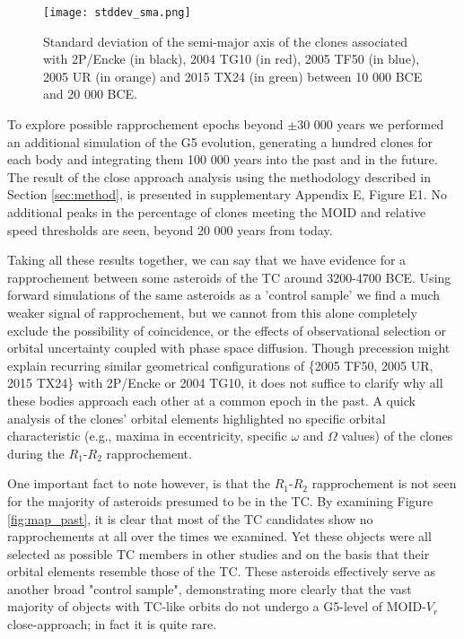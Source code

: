 \documentclass[letters,a4paper,fleqn,usenatbib]{mnras}
\begin{document}
 \begin{figure}
     \centering
     \texttt{[image: stddev\_sma.png]} 
     \caption{Standard deviation of the semi-major axis of the clones associated with 2P/Encke (in black), 2004 TG10 (in red), 2005 TF50 (in blue), 2005 UR (in orange) and 2015 TX24 (in green) between 10 000 BCE and 20 000 BCE.}
     \label{fig:sma_dispersion}
 \end{figure}
 
 To explore possible rapprochement epochs beyond $\pm$30 000 years we performed an additional simulation of the G5 evolution, generating a hundred clones for each body and integrating them  100 000 years into the past and in the future. The result of the close approach analysis using the methodology described in Section \ref{sec:method}, is presented in supplementary Appendix E, Figure E1. No additional peaks in the percentage of clones meeting the MOID and relative speed thresholds are seen, beyond 20 000 years from today. 
 
Taking all these results together, we can say that we have evidence for a rapprochement between some asteroids of the TC around 3200-4700 BCE. Using forward simulations of the same asteroids as a 'control sample' we find a much weaker signal of rapprochement, but we cannot from this alone completely exclude the possibility of coincidence, or the effects of observational selection or orbital uncertainty coupled with phase space diffusion. Though precession might explain recurring similar geometrical configurations of \{2005 TF50, 2005 UR, 2015 TX24\} with 2P/Encke or 2004 TG10, it does not suffice to clarify why all these bodies approach each other at a common epoch in the past. A quick analysis of the clones' orbital elements highlighted no specific orbital characteristic (e.g., maxima in eccentricity, specific $\omega$ and $\Omega$ values) of the clones during the $R_1$-$R_2$ rapprochement. 

One important fact to note however, is that the $R_1$-$R_2$ rapprochement is not seen for the majority of asteroids presumed to be in the TC. By examining Figure \ref{fig:map_past}, it is clear that most of the TC candidates show no rapprochements at all over the times we examined. Yet these objects were all selected as possible TC members in other studies and on the basis that their orbital elements resemble those of the TC. These asteroids effectively serve as another broad "control sample", demonstrating more clearly that the vast majority of objects with TC-like orbits do not undergo a G5-level of MOID-$V_r$ close-approach; in fact it is quite rare. 
\end{document}
